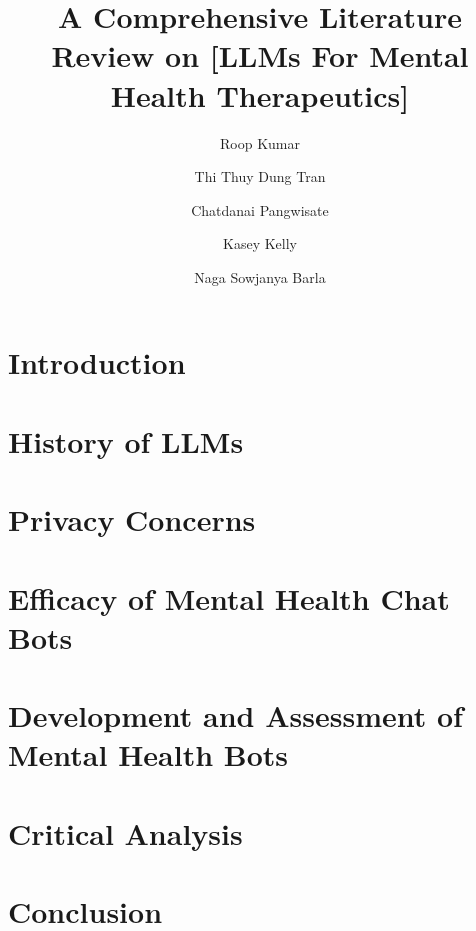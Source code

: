 \documentclass[12pt, letterpaper]{article} %
\title{A Comprehensive Literature Review on [LLMs For ​Mental Health Therapeutics​]}
\author{
  Roop Kumar \and
  Thi Thuy Dung Tran\and
  Chatdanai Pangwisate \and
  Kasey Kelly \and
  Naga Sowjanya Barla
}
\date{}
\begin{document}
\maketitle  %

\begin{abstract}
\end{abstract}

\tableofcontents 
\section{Introduction}
    

\section{History of LLMs}
     

\section{Privacy Concerns}
     

\section{Efficacy of Mental Health Chat Bots}
     

\section{Development and Assessment of Mental Health Bots}
     

\section{Critical Analysis}
     

\section{Conclusion}
     

\end{document}
